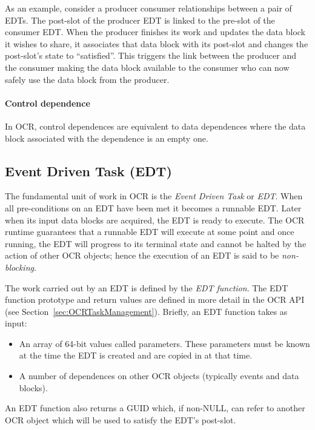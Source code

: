 As an example,
consider a producer consumer relationships between a pair of EDTs. The post-slot of the producer
EDT is linked to the pre-slot of the consumer EDT. When the producer
finishes its work and updates the data block it wishes to share, it
associates that data block with its post-slot and changes the
post-slot's state to ``satisfied''. This triggers the link between the
producer and the consumer making the data block available to the
consumer who can now safely use the data block from the producer.
%
\paragraph{Control dependence}
In OCR, control dependences are equivalent to data dependences where
the data block associated with the dependence is an empty one.

\subsection{Event Driven Task (EDT)}
\label{sec:EDT}
The fundamental unit of work in OCR is
the \emph{Event Driven Task} or \emph{EDT}.
When all pre-conditions on an EDT have been met it becomes a runnable EDT.
Later when its input data blocks are acquired, the EDT is ready to
execute. The OCR runtime guarantees that a runnable EDT will execute
at some point and once running, the EDT will progress to its terminal state
and cannot be halted by the action of other OCR objects; hence the
execution of an EDT is said to be \emph{non-blocking}.

The work carried out by an EDT is defined by
the \emph{EDT function}. The EDT function
prototype and return values are defined in more detail in the OCR API (see
Section~\ref{sec:OCRTaskManagement}). Briefly, an EDT function takes
as input:
\begin{itemize}
\item An array of 64-bit values called parameters. These parameters
  must be known at the time the EDT is created and are copied in at
  that time.
\item A number of dependences on other OCR objects (typically events
  and data blocks).
\end{itemize}

An EDT function also returns a GUID which, if non-NULL, can refer to
another OCR object which will be used to satisfy the EDT's post-slot.

